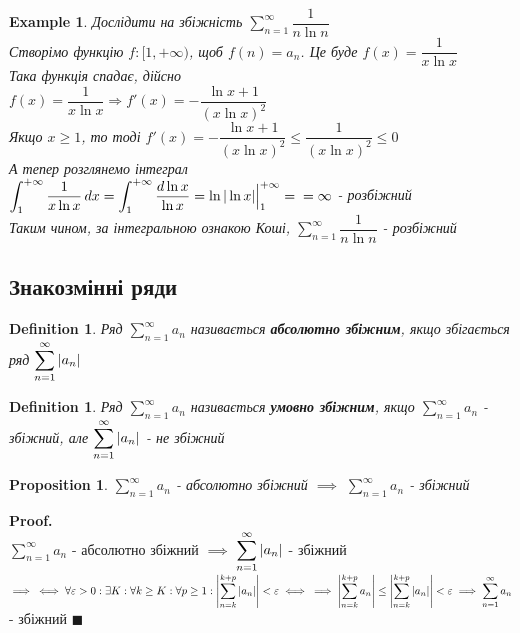 \documentclass[a4paper, 14pt]{extarticle}
\def\huge{\displaystyle}
\def\bigline{\vspace{5mm}\\}
\theoremstyle{theoremdd}
\theoremstyle{theoremdd}
\newtheorem{definition}[theorem]{Definition}
\theoremstyle{theoremdd}
\theoremstyle{theoremdd}
\newtheorem{example}[theorem]{Example}
\theoremstyle{theoremdd}
\newtheorem{proposition}[theorem]{Proposition}
\theoremstyle{theoremdd}
\theoremstyle{theoremdd}
\theoremstyle{theoremdd}
\newenvironment{pf}{\vspace*{-3mm} \textbf{Proof. \\}}{$\blacksquare$}
\begin{document}
\begin{example}
Дослідити на збіжність $\huge\sum_{n=1}^\infty \dfrac{1}{n \ln n}$\\
Створімо функцію $f: [1,+\infty)$, щоб $f(n) = a_n$. Це буде $f(x) = \dfrac{1}{x \ln x}$\\
Така функція спадає, дійсно\\
$f(x) = \dfrac{1}{x \ln x} \Rightarrow f'(x) = -\dfrac{\ln x + 1}{(x \ln x)^2}$\\
Якщо $x \geq 1$, то тоді $f'(x) = -\dfrac{\ln x + 1}{(x \ln x)^2} \leq \dfrac{1}{(x \ln x)^2} \leq 0$\\
А тепер розглянемо інтеграл $\huge\int_1^{+\infty} \dfrac{1}{x \ln x} \, dx = \int_1^{+\infty} \dfrac{d \ln x}{\ln x} = \ln |\ln x| \Big|_{1}^{+\infty} = \\ = \infty$ - розбіжний\\
Таким чином, за інтегральною ознакою Коші, $\huge\sum_{n=1}^\infty \dfrac{1}{n \ln n}$ - розбіжний
\bigline
\end{example}

\subsection{Знакозмінні ряди}
\begin{definition}
Ряд $\huge \sum_{n=1}^\infty a_n$ називається \textbf{абсолютно збіжним}, якщо збігається ряд $\huge \sum_{n=1}^\infty \abs{a_n}$
\end{definition}

\begin{definition}
Ряд $\huge \sum_{n=1}^\infty a_n$ називається \textbf{умовно збіжним}, якщо $\huge \sum_{n=1}^\infty a_n$ - збіжний, але $\huge \sum_{n=1}^\infty \abs{a_n}$ - не збіжний
\end{definition}

\begin{proposition}
$\huge \sum_{n=1}^\infty a_n$ - абсолютно збіжний $\implies$ $\huge \sum_{n=1}^\infty a_n$ - збіжний
\end{proposition}

\begin{pf}
$\huge \sum_{n=1}^\infty a_n$ - абсолютно збіжний $\implies$ $\huge \sum_{n=1}^\infty \abs{a_n}$ - збіжний $\implies \\ \iff \forall \varepsilon > 0: \exists K: \forall k \geq K: \forall p \geq 1: \huge \abs{\sum_{n=k}^{k+p} \abs{a_n}} < \varepsilon \iff \\
\implies \abs{\sum_{n=k}^{k+p} a_n} \leq \abs{\sum_{n=k}^{k+p} \abs{a_n}} < \varepsilon \implies  \sum_{n=1}^\infty a_n$ - збіжний
\end{pf}
\bigline
\end{document}
